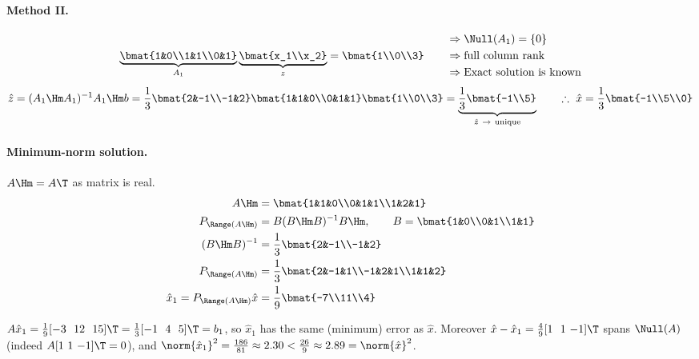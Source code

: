 \begin{example}
\paragraph{Method II.}
\[
\underbrace{\bmat{1&0\\1&1\\0&1}}_{A_1}\underbrace{\bmat{x_1\\x_2}}_{z}=\bmat{1\\0\\3}
\qquad
\begin{aligned}
&\Rightarrow\Null(A_1)=\{0\}\\
&\Rightarrow\text{full column rank}\\
&\Rightarrow\text{Exact solution is known}
\end{aligned}
\]
\[
\hat{z}=(A_1\Hm A_1)^{-1}A_1\Hm b=\frac13\bmat{2&-1\\-1&2}\bmat{1&1&0\\0&1&1}\bmat{1\\0\\3}=\underbrace{\frac13\bmat{-1\\5}}_{\hat{z}\ \to\ \text{unique}}
\qquad\therefore\ \hat{x}=\frac13\bmat{-1\\5\\0}
\]

\paragraph{Minimum-norm solution.} $A\Hm=A\T$ as matrix is real.
\begin{align*}
A\Hm&=\bmat{1&1&0\\0&1&1\\1&2&1}\\
P_{\Range(A\Hm)}&=B(B\Hm B)^{-1}B\Hm,\qquad B=\bmat{1&0\\0&1\\1&1}\\
(B\Hm B)^{-1}&=\frac13\bmat{2&-1\\-1&2}\\
P_{\Range(A\Hm)}&=\frac13\bmat{2&-1&1\\-1&2&1\\1&1&2}\\
\hat{x}_1=P_{\Range(A\Hm)}\hat{x}&=\frac19\bmat{-7\\11\\4}
\end{align*}
\begin{insight}[Check]
$A\hat x_1=\tfrac19[-3\ \ 12\ \ 15]\T=\tfrac13[-1\ \ 4\ \ 5]\T=b_1$, so $\hat x_1$ has the same (minimum) error as $\hat x$. Moreover $\hat x-\hat x_1=\tfrac49[1\ \ 1\ {-1}]\T$ spans $\Null(A)$ (indeed $A[1\ 1\ {-1}]\T=0$), and
$\norm{\hat x_1}^2=\tfrac{186}{81}\approx2.30<\tfrac{26}{9}\approx2.89=\norm{\hat x}^2$.
\end{insight}
\end{example}

